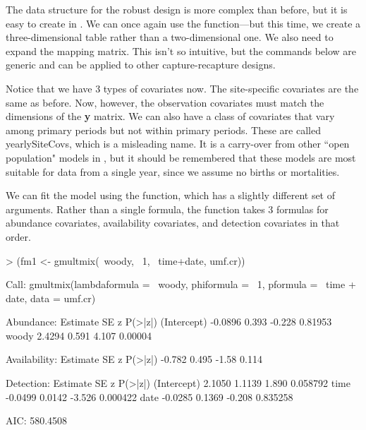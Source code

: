 \documentclass[a4paper]{article}
\renewenvironment{Schunk}{\vspace{\topsep}}{\vspace{\topsep}}
\begin{document}
The data structure for the robust design is more complex than before,
but it is easy to create in . We can once again use the
 function---but this time, we create a three-dimensional table
rather than a two-dimensional one. We also need to expand the
 mapping matrix. This isn't so intuitive, but the
commands below are generic and can be applied to other
capture-recapture designs.

\begin{Schunk}
\end{Schunk}


Notice that we have 3 types of covariates now. The site-specific
covariates are the same as before. Now, however, the observation
covariates must match the dimensions of the {\bf y} matrix. We can
also have a class of covariates that vary among primary periods but
not within primary periods. These are called yearlySiteCovs, which is
a misleading name. It is a carry-over from other ``open population"
models in , but it should be remembered that these
models are most suitable for data from a single year, since we assume
no births or mortalities.

We can fit the model using the  function, which has a
slightly different set of arguments. Rather than a single formula, the
function takes 3 formulas for abundance covariates, availability
covariates, and detection covariates in that order.


\begin{Schunk}
\begin{Sinput}
> (fm1 <- gmultmix(~woody, ~1, ~time+date, umf.cr))
\end{Sinput}
\begin{Soutput}
Call:
gmultmix(lambdaformula = ~woody, phiformula = ~1, pformula = ~time + 
    date, data = umf.cr)

Abundance:
            Estimate    SE      z P(>|z|)
(Intercept)  -0.0896 0.393 -0.228 0.81953
woody         2.4294 0.591  4.107 0.00004

Availability:
 Estimate    SE     z P(>|z|)
   -0.782 0.495 -1.58   0.114

Detection:
            Estimate     SE      z  P(>|z|)
(Intercept)   2.1050 1.1139  1.890 0.058792
time         -0.0499 0.0142 -3.526 0.000422
date         -0.0285 0.1369 -0.208 0.835258

AIC: 580.4508 
\end{Soutput}
\end{Schunk}
\end{document}
